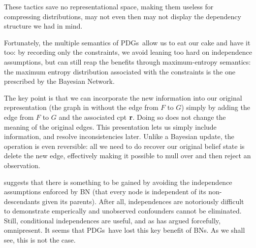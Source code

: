 \documentclass{article}
\newcommand{\MN}{PDG}
\newcommand{\MNs}{\MN s}
\numberwithin{equation}{section}
\begin{document}
\begin{example}
\begin{vfull}
{			\centerline{}
		
			These tactics save no representational space, making them useless for compressing distributions, may not even then may not display the dependency structure we had in mind. 
			
			Fortunately, the multiple semantics of \MNs\ allow us to eat our cake and have it too: by recording only the constraints, we avoid leaning too hard on independence assumptions, but can still reap the benefits through maximum-entropy semantics: the maximum entropy distribution associated with the constraints is the one prescribed by the Bayesian Network.
		}
		\end{vfull}
	
		The key point is that we can incorporate the new information into
		our original representation (the graph in 
		without the edge from $F$ to $G$) simply  by adding the edge from $F$
		to $G$ and the associated cpt $\mathbf r$.  Doing so does not change the meaning
		of the original edges.  This presentation lets us simply include
		information, and resolve inconsistencies later. Unlike a Bayesian
		update, the operation is even reversible: all we need to do recover
		our original belief state is delete the new edge, effectively making
		it possible to mull over and then reject an observation.
	\end{example}

	 suggests that there is something to be gained by avoiding the independence assumptions enforced by BN (that every node is independent of its non-descendants given its parents). After all, independences are notoriously difficult to demonstrate emperically and unobserved confounders cannot be eliminated.
	Still, conditional independences are useful, and as \textcite{pearl2014probabilistic} has argued forcefully, omnipresent.
	It seems that \MNs\ have lost this key benefit of BNs.  As we shall see, this is not the case.  
	
\end{document}
